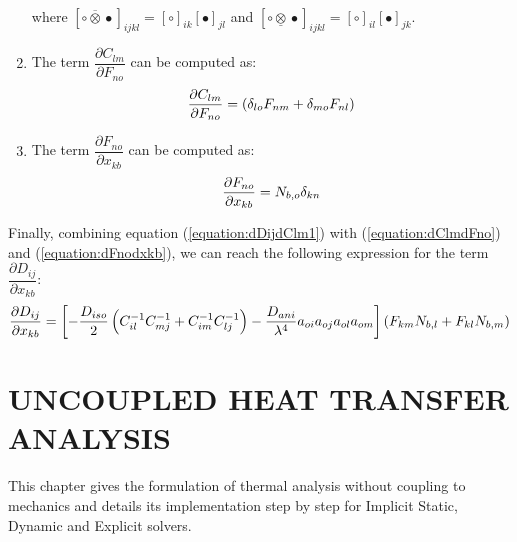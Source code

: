 \documentclass[oneside,11pt,times]{book}
\begin{document}
\begin{enumerate}
\begin{equation}
            \label{equation:dDdC}
        \end{equation}
        \\
        where $\left[\circ\overline{\otimes}\bullet\right]_{ijkl}=\left[\circ\right]_{ik}\left[\bullet\right]_{jl}$ and $\left[\circ\underline{\otimes}\bullet\right]_{ijkl}=\left[\circ\right]_{il}\left[\bullet\right]_{jk}$.\\
    \item The term $\dfrac{\partial{{C_{lm}}}}{\partial{F_{no}}}$ can be computed as:
        \begin{equation}
            \centering
            \dfrac{\partial{{C_{lm}}}}{\partial{F_{no}}}=\left(\delta_{lo}F_{nm}+\delta_{mo}F_{nl}\right)
            \label{equation:dClmdFno}
        \end{equation}
    \item The term $\dfrac{\partial{F_{no}}}{\partial{x_{kb}}}$ can be computed as:
        \begin{equation}
            \centering
            \dfrac{\partial{F_{no}}}{\partial{x_{kb}}}=N_{b,o}\delta_{kn}
            \label{equation:dFnodxkb}
        \end{equation}
\end{enumerate}
Finally, combining equation (\ref{equation:dDijdClm1}) with (\ref{equation:dClmdFno}) and (\ref{equation:dFnodxkb}), we can reach the following expression for the term $\dfrac{\partial{{D_{ij}}}}{\partial{x_{kb}}}$:
\begin{equation}
\begin{aligned}
\centering
\dfrac{\partial{D_{ij}}}{\partial{x_{kb}}}=\left[-\dfrac{D_{iso}}{2}\left(C^{-1}_{il}C^{-1}_{mj}+C^{-1}_{im}C^{-1}_{lj}\right)-\dfrac{D_{ani}}{\lambda^{4}}a_{oi}a_{oj}a_{ol}a_{om}\right]\left(F_{km}N_{b,l}+F_{kl}N_{b,m}\right)
\end{aligned}
\label{equation:dDijdxkb}
\end{equation}

\section{UNCOUPLED HEAT TRANSFER ANALYSIS}

This chapter gives the formulation of thermal analysis without coupling to mechanics and details its implementation step by step for Implicit Static, Dynamic and Explicit solvers.
\\
\end{document}
